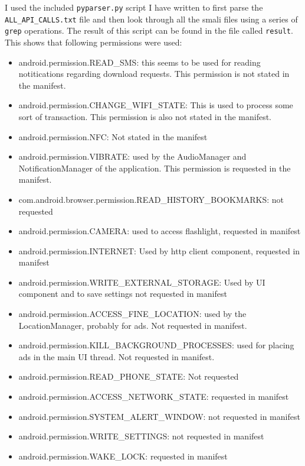 \documentclass[10pt,a4paper]{article}
\begin{document}
I used the included \texttt{pyparser.py} script I have written to first parse the
\texttt{ALL\_API\_CALLS.txt} file and then look through all the smali files
using a series of \texttt{grep} operations. The result of this script can be
found in the file called \texttt{result}.\\
This shows that following permissions were used:
\begin{itemize}
  \item android.permission.READ\_SMS: this seems to be used for reading
    notitications regarding download requests. This permission is not stated in
    the manifest.
  \item android.permission.CHANGE\_WIFI\_STATE: This is used to process some
    sort of transaction. This permission  is also not
    stated in the manifest.
  \item android.permission.NFC: Not stated in the manifest
  \item android.permission.VIBRATE: used by the AudioManager and
    NotificationManager of the application. This permission is requested in the
    manifest.
  \item com.android.browser.permission.READ\_HISTORY\_BOOKMARKS: not requested
  \item android.permission.CAMERA: used to access flashlight, requested in
    manifest
  \item android.permission.INTERNET: Used by http client component, requested in
    manifest
  \item android.permission.WRITE\_EXTERNAL\_STORAGE: Used by UI component and to
    save settings not requested in manifest
  \item android.permission.ACCESS\_FINE\_LOCATION: used by the LocationManager,
    probably for ads. Not requested in manifest.
  \item android.permission.KILL\_BACKGROUND\_PROCESSES: used for placing ads in
    the main UI thread. Not requested in manifest.
  \item  android.permission.READ\_PHONE\_STATE: Not requested
  \item android.permission.ACCESS\_NETWORK\_STATE: requested in manifest 
  \item android.permission.SYSTEM\_ALERT\_WINDOW: not requested in manifest 

  \item android.permission.WRITE\_SETTINGS: not requested in manifest 

  \item android.permission.WAKE\_LOCK: requested in manifest 
\end{itemize}
\end{document}
